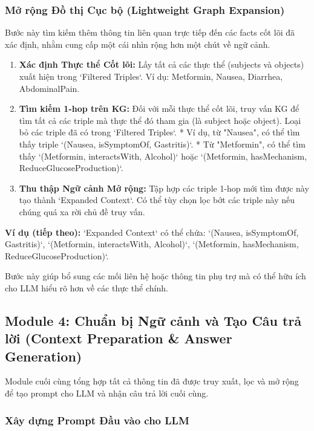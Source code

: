 \documentclass[../main.tex]{subfiles}
\begin{document}
\subsubsection{Mở rộng Đồ thị Cục bộ (Lightweight Graph Expansion)}

Bước này tìm kiếm thêm thông tin liên quan trực tiếp đến các facts cốt lõi đã xác định, nhằm cung cấp một cái nhìn rộng hơn một chút về ngữ cảnh.

\begin{enumerate}
    \item \textbf{Xác định Thực thể Cốt lõi:} Lấy tất cả các thực thể (subjects và objects) xuất hiện trong `Filtered Triples`. Ví dụ: {Metformin, Nausea, Diarrhea, AbdominalPain}.
    \item \textbf{Tìm kiếm 1-hop trên KG:} Đối với mỗi thực thể cốt lõi, truy vấn KG để tìm tất cả các triple mà thực thể đó tham gia (là subject hoặc object). Loại bỏ các triple đã có trong `Filtered Triples`.
        *   Ví dụ, từ "Nausea", có thể tìm thấy triple `(Nausea, isSymptomOf, Gastritis)`.
        *   Từ "Metformin", có thể tìm thấy `(Metformin, interactsWith, Alcohol)` hoặc `(Metformin, hasMechanism, ReduceGlucoseProduction)`.
    \item \textbf{Thu thập Ngữ cảnh Mở rộng:} Tập hợp các triple 1-hop mới tìm được này tạo thành `Expanded Context`. Có thể tùy chọn lọc bớt các triple này nếu chúng quá xa rời chủ đề truy vấn.

\end{enumerate}
\textbf{Ví dụ (tiếp theo):}
`Expanded Context` có thể chứa: {`(Nausea, isSymptomOf, Gastritis)`, `(Metformin, interactsWith, Alcohol)`, `(Metformin, hasMechanism, ReduceGlucoseProduction)`}.

Bước này giúp bổ sung các mối liên hệ hoặc thông tin phụ trợ mà có thể hữu ích cho LLM hiểu rõ hơn về các thực thể chính.

\subsection{Module 4: Chuẩn bị Ngữ cảnh và Tạo Câu trả lời (Context Preparation \& Answer Generation)}

Module cuối cùng tổng hợp tất cả thông tin đã được truy xuất, lọc và mở rộng để tạo prompt cho LLM và nhận câu trả lời cuối cùng.

\subsubsection{Xây dựng Prompt Đầu vào cho LLM}
\end{document}
